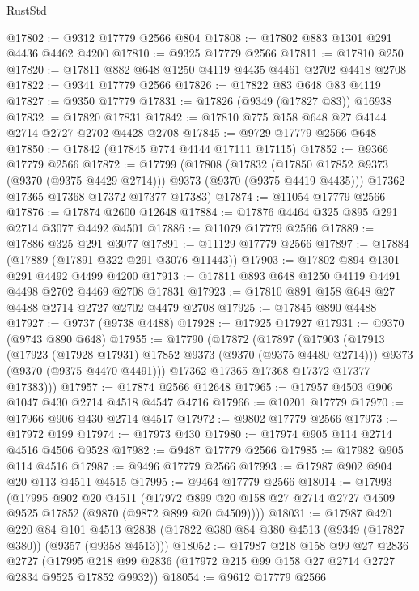 \begin{lexlean}{RustStd}
\begin{coremodule}
@17802 := @9312 @17779 @2566 @804
@17808 := @17802 @883 @1301 @291 @4436 @4462 @4200
@17810 := @9325 @17779 @2566
@17811 := @17810 @250
@17820 := @17811 @882 @648 @1250 @4119 @4435 @4461 @2702 @4418 @2708
@17822 := @9341 @17779 @2566
@17826 := @17822 @83 @648 @83 @4119
@17827 := @9350 @17779
@17831 := @17826 (@9349 (@17827 @83)) @16938
@17832 := @17820 @17831
@17842 := @17810 @775 @158 @648 @27 @4144 @2714 @2727 @2702 @4428 @2708
@17845 := @9729 @17779 @2566 @648
@17850 := @17842 (@17845 @774 @4144 @17111 @17115)
@17852 := @9366 @17779 @2566
@17872 := @17799
    (@17808
      (@17832 (@17850 @17852 @9373 (@9370 (@9375 @4429 @2714))) @9373 (@9370 (@9375 @4419 @4435)))
      @17362
      @17365
      @17368
      @17372
      @17377
      @17383)
@17874 := @11054 @17779 @2566
@17876 := @17874 @2600 @12648
@17884 := @17876 @4464 @325 @895 @291 @2714 @3077 @4492 @4501
@17886 := @11079 @17779 @2566
@17889 := @17886 @325 @291 @3077
@17891 := @11129 @17779 @2566
@17897 := @17884 (@17889 (@17891 @322 @291 @3076 @11443))
@17903 := @17802 @894 @1301 @291 @4492 @4499 @4200
@17913 := @17811 @893 @648 @1250 @4119 @4491 @4498 @2702 @4469 @2708 @17831
@17923 := @17810 @891 @158 @648 @27 @4488 @2714 @2727 @2702 @4479 @2708
@17925 := @17845 @890 @4488
@17927 := @9737 (@9738 @4488)
@17928 := @17925 @17927
@17931 := @9370 (@9743 @890 @648)
@17955 := @17790
    (@17872
      (@17897
        (@17903
          (@17913
            (@17923 (@17928 @17931) @17852 @9373 (@9370 (@9375 @4480 @2714)))
            @9373
            (@9370 (@9375 @4470 @4491)))
          @17362
          @17365
          @17368
          @17372
          @17377
          @17383)))
@17957 := @17874 @2566 @12648
@17965 := @17957 @4503 @906 @1047 @430 @2714 @4518 @4547 @4716
@17966 := @10201 @17779
@17970 := @17966 @906 @430 @2714 @4517
@17972 := @9802 @17779 @2566
@17973 := @17972 @199
@17974 := @17973 @430
@17980 := @17974 @905 @114 @2714 @4516 @4506 @9528
@17982 := @9487 @17779 @2566
@17985 := @17982 @905 @114 @4516
@17987 := @9496 @17779 @2566
@17993 := @17987 @902 @904 @20 @113 @4511 @4515
@17995 := @9464 @17779 @2566
@18014 := @17993
    (@17995
      @902
      @20
      @4511
      (@17972 @899 @20 @158 @27 @2714 @2727 @4509 @9525 @17852 (@9870 (@9872 @899 @20 @4509))))
@18031 := @17987
    @420
    @220
    @84
    @101
    @4513
    @2838
    (@17822 @380 @84 @380 @4513 (@9349 (@17827 @380)) (@9357 (@9358 @4513)))
@18052 := @17987
    @218
    @158
    @99
    @27
    @2836
    @2727
    (@17995 @218 @99 @2836 (@17972 @215 @99 @158 @27 @2714 @2727 @2834 @9525 @17852 @9932))
@18054 := @9612 @17779 @2566

\end{coremodule}
\end{lexlean}

